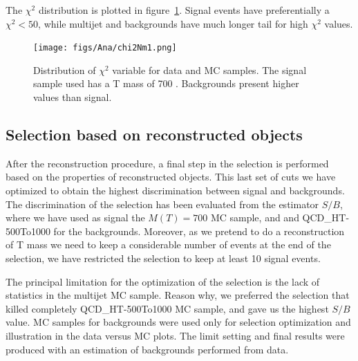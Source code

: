 The $\chi^{2}$ distribution is plotted in figure~\ref{fig:chi2}. Signal events have preferentially a $\chi^{2}<50$, while multijet and \ttbar backgrounds have much longer tail for high $\chi^{2}$ values.

\begin{figure}[!Hhtbp]
  \begin{center}
    \texttt{[image: figs/Ana/chi2Nm1.png]}
    \caption{Distribution of $\chi^{2}$ variable for data and MC samples. The signal sample used has a T mass of 700 \GeVcc. Backgrounds present higher values than signal.}
    \label{fig:chi2}
  \end{center}
\end{figure}

\subsection{Selection based on reconstructed objects}

After the reconstruction procedure, a final step in the selection is performed based on the properties of reconstructed objects. This last set of cuts we have optimized to obtain the highest discrimination between signal and backgrounds. The discrimination of the selection has been evaluated from the estimator $S/B$, where we have used as signal the $M(T)=700$ \GeVcc MC sample, and \ttbar and QCD\_HT-500To1000 for the backgrounds. Moreover, as we pretend to do a reconstruction of T mass we need to keep a considerable number of events at the end of the selection, we have restricted the selection to keep at least 10 signal events. 

The principal limitation for the optimization of the selection is the lack of statistics in the multijet MC sample. Reason why, we preferred the selection that killed completely QCD\_HT-500To1000 MC sample, and gave us the highest $S/B$ value. MC samples for backgrounds were used only for selection optimization and illustration in the data versus MC plots. The limit setting and final results were produced with an estimation of backgrounds performed from data.  

